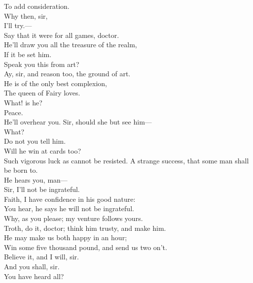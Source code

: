 \documentclass[a4paper,oneside,12pt]{memoir}
\begin{document}
\begin{drama*}
To add consideration.\\
\facespeaks {} Why then, sir,\\
I'll try.---\\
 Say that it were for all games, doctor.\\
\subtlespeaks He'll draw you all the treasure of the realm,\\
If it be set him.\\
\facespeaks {} Speak you this from art?\\
\subtlespeaks Ay, sir, and reason too, the ground of art.\\
He is of the only best complexion,\\
The queen of Fairy loves.\\
\facespeaks {} What! is he?\\
\subtlespeaks {} Peace.\\
He'll overhear you. Sir, should she but see him---\\
\facespeaks What?\\
\subtlespeaks {} Do not you tell him.\\
\facespeaks {} Will he win at cards too?\\
\subtlespeaks Such vigorous luck as cannot be resisted.
\facespeaks A strange success, that some man shall be born to.\\
\subtlespeaks He hears you, man---\\
\dapperspeaks {} Sir, I'll not be ingrateful.\\
\facespeaks Faith, I have confidence in his good nature:\\
You hear, he says he will not be ingrateful.\\
\subtlespeaks Why, as you please; my venture follows yours.\\
\facespeaks Troth, do it, doctor; think him trusty, and make him.\\
He may make us both happy in an hour;\\
Win some five thousand pound, and send us two on't.\\
\dapperspeaks Believe it, and I will, sir.\\
\facespeaks {} And you shall, sir.\\
You have heard all?\\

\end{drama*}
\end{document}
